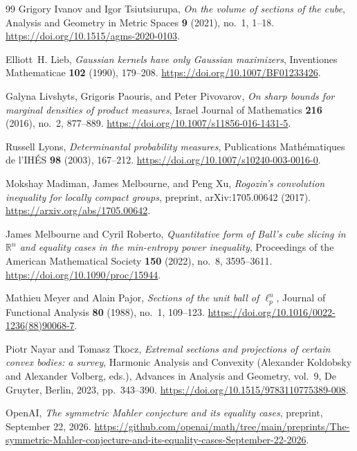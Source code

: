 \documentclass[11pt,a4paper]{article}
\theoremstyle{remark}\newtheorem{remark}[theorem]{Remark}
\numberwithin{equation}{section}
\begin{document}
\begin{thebibliography}{99}
Grigory Ivanov and Igor Tsiutsiurupa, \emph{On the volume of sections of the
  cube}, Analysis and Geometry in Metric Spaces \textbf{9} (2021), no.~1,
  1--18.
\newblock \url{https://doi.org/10.1515/agms-2020-0103}.

Elliott~H. Lieb, \emph{Gaussian kernels have only {Gaussian} maximizers},
  Inventiones Mathematicae \textbf{102} (1990), 179--208.
\newblock \url{https://doi.org/10.1007/BF01233426}.

Galyna Livshyts, Grigoris Paouris, and Peter Pivovarov, \emph{On sharp bounds
  for marginal densities of product measures}, Israel Journal of Mathematics
  \textbf{216} (2016), no.~2, 877--889.
\newblock \url{https://doi.org/10.1007/s11856-016-1431-5}.

Russell Lyons, \emph{Determinantal probability measures}, Publications
  Math\'ematiques de l'IH\'ES \textbf{98} (2003), 167--212.
\newblock \url{https://doi.org/10.1007/s10240-003-0016-0}.

Mokshay Madiman, James Melbourne, and Peng Xu, \emph{Rogozin's convolution inequality for locally compact groups},
preprint, arXiv:1705.00642 (2017).
\newblock \url{https://arxiv.org/abs/1705.00642}.

James Melbourne and Cyril Roberto, \emph{Quantitative form of {Ball}'s cube
  slicing in {$\mathbb R^n$} and equality cases in the min-entropy power
  inequality}, Proceedings of the American Mathematical Society \textbf{150}
  (2022), no.~8, 3595--3611.
\newblock \url{https://doi.org/10.1090/proc/15944}.

Mathieu Meyer and Alain Pajor, \emph{Sections of the unit ball of
  {$\ell_p^n$}}, Journal of Functional Analysis \textbf{80} (1988), no.~1,
  109--123.
\newblock \url{https://doi.org/10.1016/0022-1236(88)90068-7}.

Piotr Nayar and Tomasz Tkocz, \emph{Extremal sections and projections of
  certain convex bodies: a survey}, Harmonic Analysis and Convexity (Alexander
  Koldobsky and Alexander Volberg, eds.), Advances in Analysis and Geometry,
  vol.~9, De Gruyter, Berlin, 2023, pp.~343--390.
\newblock \url{https://doi.org/10.1515/9783110775389-008}.

OpenAI, \emph{The symmetric Mahler conjecture and its equality cases},
preprint, September 22, 2026.
\newblock \url{https://github.com/openai/math/tree/main/preprints/The-symmetric-Mahler-conjecture-and-its-equality-cases-September-22-2026}.


\end{thebibliography}
\end{document}
